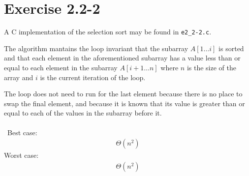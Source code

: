 \documentclass{article}
\begin{document}
\section*{Exercise 2.2-2}

A C implementation of the selection sort may be found in \texttt{e2\_2-2.c}.

The algorithm mantains the loop invariant that the subarray $A[1 \ldots i]$ is sorted and that each element in the aforementioned subarray has a value less than or equal to each element in the subarray $A[i+1 \ldots n]$ where $n$ is the size of the array and $i$ is the current iteration of the loop.

The loop does not need to run for the last element because there is no place to swap the final element, and because it is known that its value is greater than or equal to each of the values in the subarray before it.
\\ \\
\noindent~Best case:
\begin{eqnarray*}
	\Theta(n^2)
\end{eqnarray*}
Worst case:
\begin{eqnarray*}
	\Theta(n^2)
\end{eqnarray*}
\end{document}
